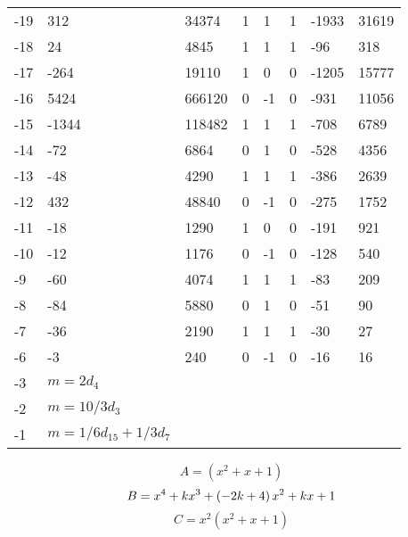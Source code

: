 \documentclass{amsart}
\begin{document}
\begin{longtable}{|l|l|l|lllll|}
-19&312&34374&1&1&1&-1933&31619\\
-18&24&4845&1&1&1&-96&318\\
-17&-264&19110&1&0&0&-1205&15777\\
-16&5424&666120&0&-1&0&-931&11056\\
-15&-1344&118482&1&1&1&-708&6789\\
-14&-72&6864&0&1&0&-528&4356\\
-13&-48&4290&1&1&1&-386&2639\\
-12&432&48840&0&-1&0&-275&1752\\
-11&-18&1290&1&0&0&-191&921\\
-10&-12&1176&0&-1&0&-128&540\\
-9&-60&4074&1&1&1&-83&209\\
-8&-84&5880&0&1&0&-51&90\\
-7&-36&2190&1&1&1&-30&27\\
-6&-3&240&0&-1&0&-16&16\\
-3&$m=2d_{4}$&&\multicolumn{5}{c|}{}\\
-2&$m=10/3d_{3}$&&\multicolumn{5}{c|}{}\\
-1&$m=1/6d_{15}+1/3d_{7}$&&\multicolumn{5}{c|}{}\\
\hline
\end{longtable}
$$A=(x^2
 + x
 + 1)$$
$$B=x^4
 + k\*x^3
 + \left(-2\*k
 + 4\right) \*x^2
 + k\*x
 + 1$$
$$C=x^2(x^2
 + x
 + 1)$$
\end{document}
